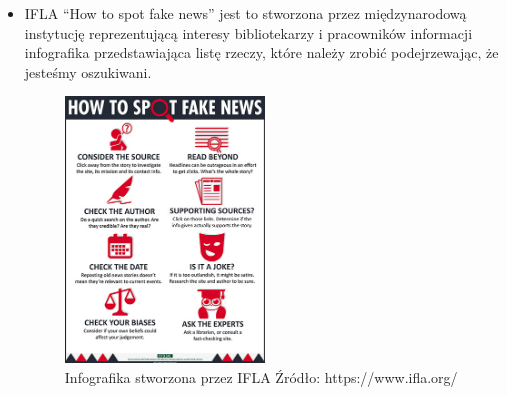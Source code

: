 \begin{itemize}
    \item IFLA ``How to spot fake news'' jest to stworzona przez międzynarodową instytucję
    reprezentującą interesy bibliotekarzy i pracowników informacji infografika
    przedstawiająca listę rzeczy, które należy zrobić podejrzewając, że jesteśmy oszukiwani.

    \begin{figure}[h!]
        \centering
        \includegraphics[width=0.5\textwidth]{./Img/how-to-spot-fake-news.jpg}
        \caption{Infografika stworzona przez IFLA Źródło: https://www.ifla.org/}
    \end{figure}


\end{itemize}
